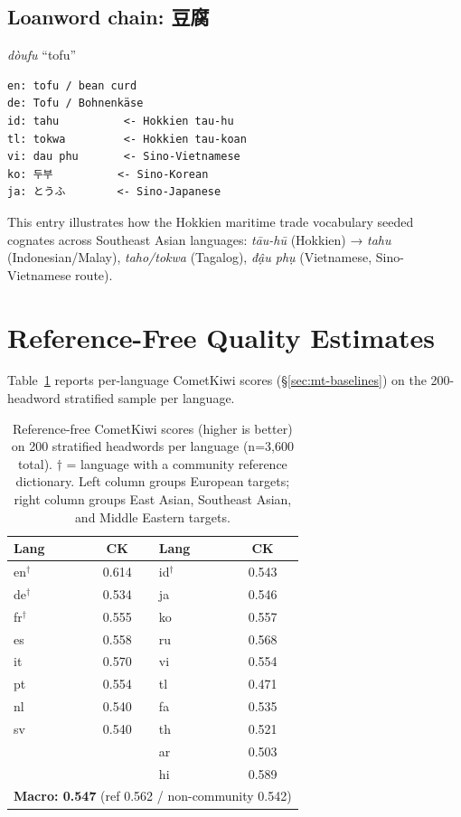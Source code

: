 \documentclass[11pt]{article}
\begin{document}
\subsection{Loanword chain: 豆腐}
\textit{dòufu} ``tofu''

\begin{lstlisting}
en: tofu / bean curd
de: Tofu / Bohnenkäse
id: tahu          <- Hokkien tau-hu
tl: tokwa         <- Hokkien tau-koan
vi: dau phu       <- Sino-Vietnamese
ko: 두부          <- Sino-Korean
ja: とうふ        <- Sino-Japanese
\end{lstlisting}

This entry illustrates how the Hokkien maritime trade vocabulary seeded cognates across Southeast Asian languages: \textit{tāu-hū} (Hokkien) → \textit{tahu} (Indonesian/Malay), \textit{taho/tokwa} (Tagalog), \textit{đậu phụ} (Vietnamese, Sino-Vietnamese route).

\section{Reference-Free Quality Estimates}
\label{sec:appendix-cometkiwi}

Table~\ref{tab:cometkiwi} reports per-language CometKiwi scores (\S\ref{sec:mt-baselines}) on the 200-headword stratified sample per language.

\begin{table}[h]
\centering
\small
\begin{tabular}{lc|lc}
\toprule
\textbf{Lang} & \textbf{CK} & \textbf{Lang} & \textbf{CK} \\
\midrule
en$^{\dagger}$ & 0.614 & id$^{\dagger}$ & 0.543 \\
de$^{\dagger}$ & 0.534 & ja & 0.546 \\
fr$^{\dagger}$ & 0.555 & ko & 0.557 \\
es & 0.558 & ru & 0.568 \\
it & 0.570 & vi & 0.554 \\
pt & 0.554 & tl & 0.471 \\
nl & 0.540 & fa & 0.535 \\
sv & 0.540 & th & 0.521 \\
      &       & ar & 0.503 \\
      &       & hi & 0.589 \\
\midrule
\multicolumn{4}{c}{\textbf{Macro: 0.547} (ref 0.562 / non-community 0.542)} \\
\bottomrule
\end{tabular}
\caption{Reference-free CometKiwi scores (higher is better) on 200 stratified headwords per language (n=3{,}600 total). $\dagger$ = language with a community reference dictionary. Left column groups European targets; right column groups East Asian, Southeast Asian, and Middle Eastern targets.}
\label{tab:cometkiwi}
\end{table}
\end{document}
